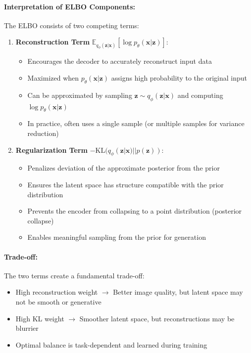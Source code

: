 \documentclass[conference]{IEEEtran}
\begin{document}
\paragraph{Interpretation of ELBO Components:}

The ELBO consists of two competing terms:

\begin{enumerate}
    \item \textbf{Reconstruction Term} $\mathbb{E}_{q_\phi(\mathbf{z}|\mathbf{x})} [\log p_\theta(\mathbf{x}|\mathbf{z})]$:
    \begin{itemize}
        \item Encourages the decoder to accurately reconstruct input data
        \item Maximized when $p_\theta(\mathbf{x}|\mathbf{z})$ assigns high probability to the original input
        \item Can be approximated by sampling $\mathbf{z} \sim q_\phi(\mathbf{z}|\mathbf{x})$ and computing $\log p_\theta(\mathbf{x}|\mathbf{z})$
        \item In practice, often uses a single sample (or multiple samples for variance reduction)
    \end{itemize}
    
    \item \textbf{Regularization Term} $-\text{KL}(q_\phi(\mathbf{z}|\mathbf{x}) || p(\mathbf{z}))$:
    \begin{itemize}
        \item Penalizes deviation of the approximate posterior from the prior
        \item Ensures the latent space has structure compatible with the prior distribution
        \item Prevents the encoder from collapsing to a point distribution (posterior collapse)
        \item Enables meaningful sampling from the prior for generation
    \end{itemize}
\end{enumerate}

\paragraph{Trade-off:}
The two terms create a fundamental trade-off:
\begin{itemize}
    \item High reconstruction weight $\rightarrow$ Better image quality, but latent space may not be smooth or generative
    \item High KL weight $\rightarrow$ Smoother latent space, but reconstructions may be blurrier
    \item Optimal balance is task-dependent and learned during training
\end{itemize}
\end{document}
